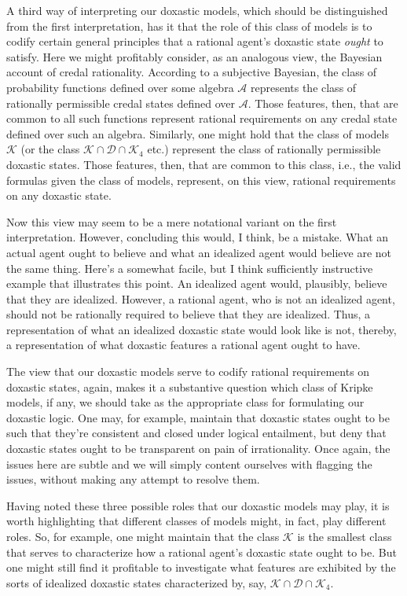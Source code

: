 A third way of interpreting our doxastic models, which should be distinguished from the first interpretation, has it that the role of this class of models is to codify certain general principles that a rational agent's doxastic state \textit{ought} to satisfy.
Here we might profitably consider, as an analogous view, the Bayesian account of credal rationality.
According to a subjective Bayesian, the class of probability functions defined over some algebra $\mathcal{A}$ represents the class of rationally permissible credal states defined over $\mathcal{A}$.
Those features, then, that are common to all such functions represent rational requirements on any credal state defined over such an algebra.
Similarly, one might hold that the class of models $\mathcal{K}$ (or the class $\mathcal{K} \cap \mathcal{D} \cap \mathcal{K}_4$ etc.) represent the class of rationally permissible doxastic states.
Those features, then, that are common to this class, i.e., the valid formulas given the class of models, represent, on this view, rational requirements on any doxastic state.

Now this view may seem to be a mere notational variant on the first interpretation.
However, concluding this would, I think, be a mistake.
What an actual agent ought to believe and what an idealized agent would believe are not the same thing.
Here's a somewhat facile, but I think sufficiently instructive example that illustrates this point.
An idealized agent would, plausibly, believe that they are idealized.
However, a rational agent, who is not an idealized agent, should not be rationally required to believe that they are idealized.
Thus, a representation of what an idealized doxastic state would look like is not, thereby, a representation of what doxastic features a rational agent ought to have.

The view that our doxastic models serve to codify rational requirements on doxastic states, again, makes it a substantive question which class of Kripke models, if any, we should take as the appropriate class for formulating our doxastic logic. 
One may, for example, maintain that doxastic states ought to be such that they're consistent and closed under logical entailment, but deny that doxastic states ought to be transparent on pain of irrationality.
Once again, the issues here are subtle and we will simply content ourselves with flagging the issues, without making any attempt to resolve them.

Having noted these three possible roles that our doxastic models may play, it is worth highlighting that different classes of models might, in fact, play different roles. 
So, for example, one might maintain that the class $\mathcal{K}$ is the smallest class that serves to characterize how a rational agent's doxastic state ought to be.
But one might still find it profitable to investigate what features are exhibited by the sorts of idealized doxastic states characterized by, say, $\mathcal{K} \cap \mathcal{D} \cap \mathcal{K}_4$.

